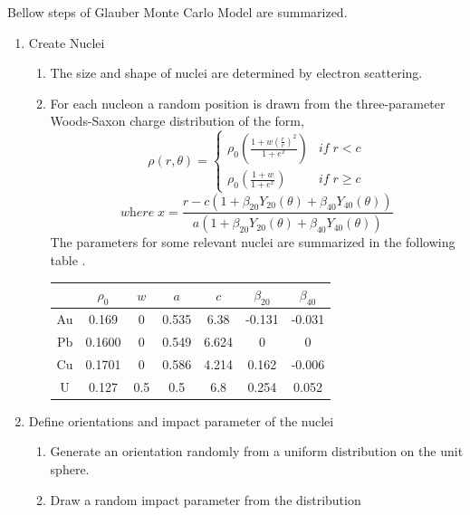 \documentclass[11pt]{article} %
\begin{document}
Bellow steps of Glauber Monte Carlo Model are summarized.
\begin{enumerate}
\item Create Nuclei
  \begin{enumerate}
    \item The size and shape of nuclei are determined by electron scattering.
    \item For each nucleon a random position is drawn from the three-parameter Woods-Saxon charge distribution of the form,
      \begin{equation}
      \rho(r,\theta)=\left\{
        \begin{array}{lr}
        \rho_0 \left( \frac{1+w\left(\frac{r}{c}\right)^2}{1+e^x} \right) & \textit{if} \; r<c \\
        \rho_0 \left( \frac{1+w}{1+e^x} \right) & \textit{if} \; r \ge c
        \end{array}
        \right.
      \end{equation}
      \begin{equation}
      \textit{where}\; x=\frac{r-c(1+\beta_{20}Y_{20}(\theta)+\beta_{40}Y_{40}(\theta))}{a(1+\beta_{20}Y_{20}(\theta)+\beta_{40}Y_{40}(\theta))}
      \end{equation}
      The parameters for some relevant nuclei are summarized in the following table \cite{flores12}.
      \begin{center}
      \begin{tabular}{|c|c|c|c|c|c|c|}
      \hline
       & $\rho_0$ & $w$ & $a$ & $c$ & $\beta_{20}$ & $\beta_{40}$ \\
       \hline
       Au & 0.169 & 0 & 0.535 & 6.38 & -0.131 & -0.031 \\
       \hline
       Pb & 0.1600 & 0 & 0.549 & 6.624 & 0 & 0 \\
       \hline
       Cu & 0.1701 & 0 & 0.586 & 4.214 & 0.162 & -0.006 \\
       \hline
       U & 0.127 & 0.5 & 0.5 & 6.8 & 0.254 & 0.052 \\
       \hline
      \end{tabular}
      \end{center}
  \end{enumerate}
\item Define orientations and impact parameter of the nuclei
	\begin{enumerate}
	\item Generate an orientation randomly from a uniform distribution on the unit sphere.
	\item Draw a random impact parameter from the distribution

\end{enumerate}
\end{enumerate}
\end{document}
